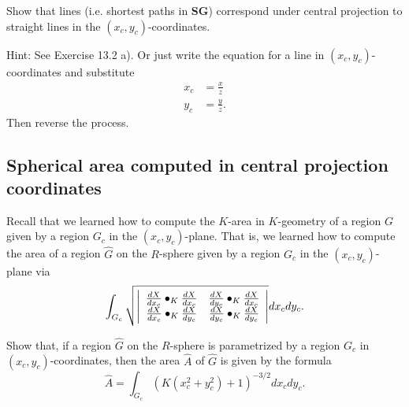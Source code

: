 \documentclass{ximera}
\begin{document}
\begin{exercise}
Show that lines (i.e. shortest paths in \textbf{SG}) correspond
under central projection to straight lines in the $\left(  x_{c},y_{c}\right)
$-coordinates.

Hint: See Exercise 13.2 %
a). Or just write the equation for a line in
$\left(  x_{c},y_{c}\right)  $-coordinates and substitute 
\begin{align*}
x_{c}  &=\frac{x}{z}\\
y_{c}  &=\frac{y}{z}.
\end{align*}
Then reverse the process.
\end{exercise}

\subsection*{Spherical area computed in central projection coordinates}

Recall that %
we learned how to compute the $K$-area in
$K$-geometry of a region $G$ given by a region $G_{c}$ in the $\left(
x_{c},y_{c}\right)  $-plane. That is, we learned how to compute the area of a
region $\hat{G}$ on the $R$-sphere given by a region $G_{c}$ in the $\left(
x_{c},y_{c}\right)  $-plane via
\[
\int\nolimits_{G_{c}}
\sqrt{\left\vert
\begin{array}
[c]{cc}%
\frac{dX}{dx_{c}}\bullet_{K}\frac{dX}{dx_{c}} & \frac{dX}{dy_{c}}\bullet
_{K}\frac{dX}{dx_{c}}\\
\frac{dX}{dx_{c}}\bullet_{K}\frac{dX}{dy_{c}} & \frac{dX}{dy_{c}}\bullet
_{K}\frac{dX}{dy_{c}}%
\end{array}
\right\vert }dx_{c}dy_{c}.
\]

\begin{exercise}
Show that, if a region $\hat{G}$ on the $R$-sphere is
parametrized by a region $G_{c}$ in $\left(  x_{c},y_{c}\right)
$-coordinates, then the area $\hat{A}$ of $\hat{G}$ is given by the formula%
\[
\hat{A}=%
{\displaystyle\int\nolimits_{G_{c}}}
\left(  K\left(  x_{c}^{2}+y_{c}^{2}\right)  +1\right)  ^{-3/2}dx_{c}dy_{c}.
\]

\end{exercise}
\end{document}
